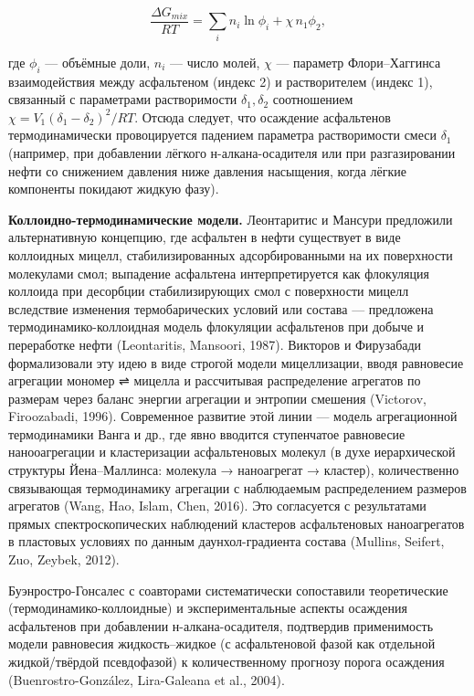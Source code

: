 \documentclass[11pt]{extarticle}
\begin{document}
\[
\frac{\Delta G_{mix}}{RT} = \sum_i n_i \ln\phi_i + \chi\, n_1 \phi_2,
\]

где \(\phi_i\) --- объёмные доли, \(n_i\) --- число молей, \(\chi\) --- параметр Флори--Хаггинса взаимодействия между асфальтеном (индекс 2) и растворителем (индекс 1), связанный с параметрами растворимости \(\delta_1, \delta_2\) соотношением \(\chi = V_1(\delta_1-\delta_2)^2/RT\). Отсюда следует, что осаждение асфальтенов термодинамически провоцируется падением параметра растворимости смеси \(\delta_1\) (например, при добавлении лёгкого н-алкана-осадителя или при разгазировании нефти со снижением давления ниже давления насыщения, когда лёгкие компоненты покидают жидкую фазу).

\textbf{Коллоидно-термодинамические модели.} Леонтаритис и Мансури предложили альтернативную концепцию, где асфальтен в нефти существует в виде коллоидных мицелл, стабилизированных адсорбированными на их поверхности молекулами смол; выпадение асфальтена интерпретируется как флокуляция коллоида при десорбции стабилизирующих смол с поверхности мицелл вследствие изменения термобарических условий или состава --- предложена термодинамико-коллоидная модель флокуляции асфальтенов при добыче и переработке нефти (Leontaritis, Mansoori, 1987). Викторов и Фирузабади формализовали эту идею в виде строгой модели мицеллизации, вводя равновесие агрегации мономер ⇌ мицелла и рассчитывая распределение агрегатов по размерам через баланс энергии агрегации и энтропии смешения (Victorov, Firoozabadi, 1996). Современное развитие этой линии --- модель агрегационной термодинамики Ванга и др., где явно вводится ступенчатое равновесие нанооагрегации и кластеризации асфальтеновых молекул (в духе иерархической структуры Йена--Маллинса: молекула → наноагрегат → кластер), количественно связывающая термодинамику агрегации с наблюдаемым распределением размеров агрегатов (Wang, Hao, Islam, Chen, 2016). Это согласуется с результатами прямых спектроскопических наблюдений кластеров асфальтеновых наноагрегатов в пластовых условиях по данным даунхол-градиента состава (Mullins, Seifert, Zuo, Zeybek, 2012).

Буэнростро-Гонсалес с соавторами систематически сопоставили теоретические (термодинамико-коллоидные) и экспериментальные аспекты осаждения асфальтенов при добавлении н-алкана-осадителя, подтвердив применимость модели равновесия жидкость--жидкое (с асфальтеновой фазой как отдельной жидкой/твёрдой псевдофазой) к количественному прогнозу порога осаждения (Buenrostro-González, Lira-Galeana et al., 2004).
\end{document}
